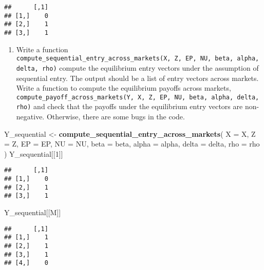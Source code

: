\documentclass[
]{book}
\newenvironment{Shaded}{\begin{snugshade}}{\end{snugshade}}
\newcommand{\AttributeTok}[1]{\textcolor[rgb]{0.13,0.29,0.53}{#1}}
\newcommand{\DecValTok}[1]{\textcolor[rgb]{0.00,0.00,0.81}{#1}}
\newcommand{\FunctionTok}[1]{\textcolor[rgb]{0.13,0.29,0.53}{\textbf{#1}}}
\newcommand{\NormalTok}[1]{#1}
\newcommand{\OtherTok}[1]{\textcolor[rgb]{0.56,0.35,0.01}{#1}}
\providecommand{\tightlist}{%
  \setlength{\itemsep}{0pt}\setlength{\parskip}{0pt}}
\begin{document}
\begin{verbatim}
##      [,1]
## [1,]    0
## [2,]    1
## [3,]    1
\end{verbatim}

\begin{enumerate}
\def\labelenumi{\arabic{enumi}.}
\setcounter{enumi}{6}
\tightlist
\item
  Write a function \texttt{compute\_sequential\_entry\_across\_markets(X,\ Z,\ EP,\ NU,\ beta,\ alpha,\ delta,\ rho)} compute the equilibrium entry vectors under the assumption of sequential entry. The output should be a list of entry vectors across markets. Write a function to compute the equilibrium payoffs across markets, \texttt{compute\_payoff\_across\_markets(Y,\ X,\ Z,\ EP,\ NU,\ beta,\ alpha,\ delta,\ rho)} and check that the payoffs under the equilibrium entry vectors are non-negative. Otherwise, there are some bugs in the code.
\end{enumerate}

\begin{Shaded}
\begin{Highlighting}[]
\NormalTok{Y\_sequential }\OtherTok{\textless{}{-}}
  \FunctionTok{compute\_sequential\_entry\_across\_markets}\NormalTok{(}
    \AttributeTok{X =}\NormalTok{ X, }
    \AttributeTok{Z =}\NormalTok{ Z, }
    \AttributeTok{EP =}\NormalTok{ EP, }
    \AttributeTok{NU =}\NormalTok{ NU, }
    \AttributeTok{beta =}\NormalTok{ beta, }
    \AttributeTok{alpha =}\NormalTok{ alpha, }
    \AttributeTok{delta =}\NormalTok{ delta, }
    \AttributeTok{rho =}\NormalTok{ rho}
\NormalTok{    )}
\NormalTok{Y\_sequential[[}\DecValTok{1}\NormalTok{]]}
\end{Highlighting}
\end{Shaded}

\begin{verbatim}
##      [,1]
## [1,]    0
## [2,]    1
## [3,]    1
\end{verbatim}

\begin{Shaded}
\begin{Highlighting}[]
\NormalTok{Y\_sequential[[M]]}
\end{Highlighting}
\end{Shaded}

\begin{verbatim}
##      [,1]
## [1,]    1
## [2,]    1
## [3,]    1
## [4,]    0
\end{verbatim}
\end{document}
